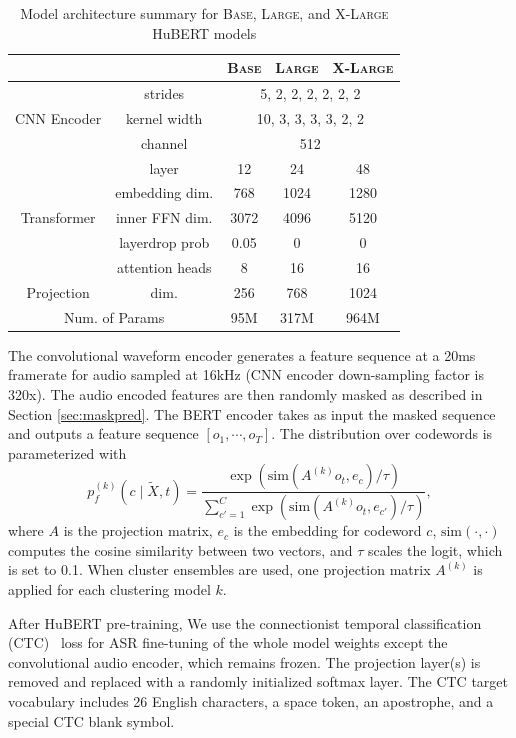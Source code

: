 \begin{table}[ht]
    \centering
    \begin{tabular}{cc|ccc}
        \toprule
         & & \textsc{Base} & \textsc{Large} & \textsc{X-Large} \\
        \midrule
        \multirow{3}{*}{CNN Encoder}
        & strides      & \multicolumn{3}{c}{5, 2, 2, 2, 2, 2, 2} \\
        & kernel width & \multicolumn{3}{c}{10, 3, 3, 3, 3, 2, 2} \\
        & channel      & \multicolumn{3}{c}{512} \\
        \midrule
        \multirow{5}{*}{Transformer} 
        & layer        & 12 & 24 & 48 \\
        & embedding dim. & 768 & 1024 & 1280 \\
        & inner FFN dim. & 3072 & 4096 & 5120 \\
        & layerdrop prob  & 0.05 & 0 & 0 \\
        & attention heads & 8 & 16 & 16 \\
        \midrule
        \multirow{1}{*}{Projection} & dim. & 256 & 768 & 1024 \\
        \midrule
        \multicolumn{2}{c|}{Num. of Params} & 95M & 317M & 964M \\
        \bottomrule
        
    \end{tabular}
    \caption{Model architecture summary for \textsc{Base}, \textsc{Large}, and \textsc{X-Large} HuBERT models}
    \label{tab:arch}
\end{table}


The convolutional waveform encoder generates a feature sequence at a 20ms framerate for audio sampled at 16kHz (CNN encoder down-sampling factor is 320x). The audio encoded features are then randomly masked as described in Section \ref{sec:maskpred}. The BERT encoder takes as input the masked sequence and outputs a feature sequence $[o_1, \cdots, o_T]$. The distribution over codewords is parameterized with
\begin{equation}
    p_f^{(k)}(c \mid \tilde{X}, t) = \frac{\exp(\text{sim}(A^{(k)} o_t, e_c) / \tau)} {\sum_{c'=1}^C \exp(\text{sim}(A^{(k)} o_t, e_{c'}) / \tau)},
\end{equation}
where $A$ is the projection matrix, $e_c$ is the embedding for codeword $c$, $\text{sim}(\cdot, \cdot)$ computes the cosine similarity between two vectors, and $\tau$ scales the logit, which is set to 0.1. When cluster ensembles are used, one projection matrix $A^{(k)}$ is applied for each clustering model $k$.

After HuBERT pre-training, We use the connectionist temporal classification (CTC)~\cite{graves2006connectionist} loss for ASR fine-tuning of the whole model weights except the convolutional audio encoder, which remains frozen. The projection layer(s) is removed and replaced with a randomly initialized softmax layer. The CTC target vocabulary includes 26 English characters, a space token, an apostrophe, and a special CTC blank symbol.
